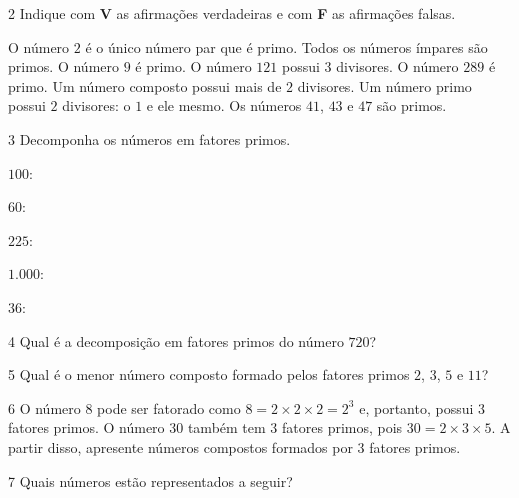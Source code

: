
\num{2} Indique com \textbf{V} as afirmações verdadeiras e com \textbf{F} as afirmações falsas.

\begin{boxlist}
 O número $2$ é o único número par que é primo.
 Todos os números ímpares são primos.
 O número $9$ é primo.
 O número $121$ possui $3$ divisores.
 O número $289$ é primo.
 Um número composto possui mais de $2$ divisores.
 Um número primo possui $2$ divisores: o $1$ e ele mesmo.
 Os números $41$, $43$ e $47$ são primos.
\end{boxlist}

\num{3} Decomponha os números em fatores primos.

\begin{escolha}
\item  $100$: 
\item  $60$: 
\item  $225$: 
\item  $1.000$: 
\item  $36$: 
\end{escolha}

\num{4} Qual é a decomposição em fatores primos do número $720$?


\num{5} Qual é o menor número composto formado pelos fatores primos $2$, $3$, $5$ e $11$?


\num{6}  O número $8$ pode ser fatorado como $8 = 2 \times 2 \times 2 = 2^3$ e, portanto,
possui $3$ fatores primos. O número $30$ também tem $3$ fatores primos, pois
$30 = 2 \times 3 \times 5$. A partir disso, apresente 
números compostos formados por $3$ fatores primos.


\num{7} Quais números estão representados a seguir?


